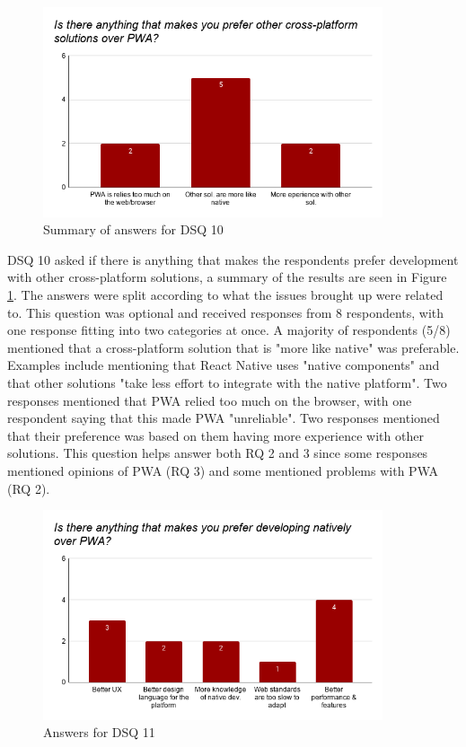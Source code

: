 \documentclass[a4paper,12pt]{article}
\begin{document}
\begin{figure}[ht!]
    \centering
    \includegraphics[width=10cm]{img/Results/dsq10.png}
    \caption{Summary of answers for DSQ 10}
    \label{fig:res_devq10}
\end{figure}

\newpage
DSQ 10 asked if there is anything that makes the respondents prefer development with other cross-platform solutions, a summary of the results are seen in Figure \ref{fig:res_devq10}. The answers were split according to what the issues brought up were related to. This question was optional and received responses from 8 respondents, with one response fitting into two categories at once. A majority of respondents (5/8) mentioned that a cross-platform solution that is "more like native" was preferable. Examples include mentioning that React Native uses "native components" and that other solutions "take less effort to integrate with the native platform". Two responses mentioned that PWA relied too much on the browser, with one respondent saying that this made PWA "unreliable". Two responses mentioned that their preference was  based on them having more experience with other solutions. This question helps answer both RQ 2 and 3 since some responses mentioned opinions of PWA (RQ 3) and some mentioned problems with PWA (RQ 2).

\begin{figure}[ht!]
    \centering
    \includegraphics[width=10cm]{img/Results/dsq11.png}
    \caption{Answers for DSQ 11}
    \label{fig:res_devq11}
\end{figure}
\end{document}
